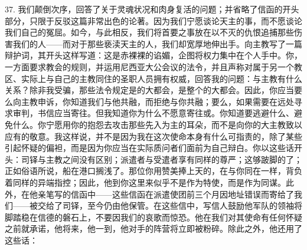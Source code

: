 37. 我们颠倒次序，回答了关于灵魂状况和肉身复活的问题；并省略了信函的开头部分，只限于反驳这篇非常出色的论著。因为我们宁愿谈论天主的事，而不愿谈论我们自己的冤屈。如今，与此相反，我们将首要之事放在以不灭的仇恨追捕那些伤害我们的人——而对于那些亵渎天主的人，我们却宽厚地伸出手。向主教写了一篇辩护词，其开头这样写道：这是赤裸裸的谄媚，企图将权力集中在个人手中。你，一方面要求教会的规则，并运用尼西亚大公会议的法令，并且声称对属于另一个教区、实际上与自己的主教同住的圣职人员拥有权威，回答我的问题：与主教有什么关系？除非我受骗，那些法令规定是的大都会，是整个的大都会。因此，你应当要么向主教申诉，你知道我们与他共融，而拒绝与你共融；要么，如果需要在远处寻求审判，书信应当寄往。但我知道你为什么不愿意寄往或。你知道要逃避什么、避免什么。你宁愿用你的抱怨去攻击那些先入为主的耳朵，而不是向你的大主教致以应有的敬意。我这样说，并不是因为我在这次使命本身有什么可指责的，除了某些引起怀疑的偏袒，而是因为你应当在实际质问者们面前为自己辩白。你以这些话开头：司铎与主教之间没有区别；派遣者与受遣者享有同样的尊严；这够跛脚的了；正如俗语所说，船在港口搁浅了。那位你用赞美捧上天的，在与你同在一样，背负着同样的异端指控；因此，他到你这里来似乎不是作为特使，而是作为同谋。此外，在他亲笔写的信函中——这些信函在派遣使团前三个月因地址错误而寄给了我们——被交给了司铎，至今仍由他保管。在这些信中，写信人鼓励他军队的领袖将脚踏稳在信德的磐石上，不要因我们的哀歌而惊恐。他在我们对其使命有任何怀疑之前就承诺，他将来，他一到，他对手的阵营将立即被粉碎。除此之外，他还用了这些话：\par

